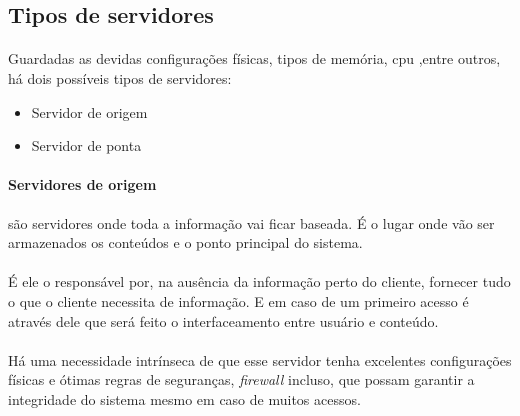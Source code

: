 \subsection{Tipos de servidores}
\label{section:tipos_de_servidores}
\paragraph{}
Guardadas as devidas configura\c{c}\~oes f\'isicas, tipos de mem\'oria, cpu ,entre outros, h\'a dois poss\'iveis tipos de servidores:
\begin{itemize}
	\item Servidor de origem
	\item Servidor de ponta
\end{itemize}

\paragraph{Servidores de origem}s\~ao servidores onde toda a informa\c{c}\~ao vai ficar baseada. \'E o lugar onde v\~ao ser armazenados os conte\'udos e o ponto principal do sistema.
\paragraph{}
\'E ele o respons\'avel por, na aus\^encia da informa\c{c}\~ao perto do cliente, fornecer tudo o que o cliente necessita de informa\c{c}\~ao. E em caso de um primeiro acesso \'e atrav\'es dele que ser\'a feito o interfaceamento entre usu\'ario e conte\'udo.
\paragraph{}
H\'a uma necessidade intr\'inseca de que esse servidor tenha excelentes configura\c{c}\~oes f\'isicas e \'otimas regras de seguran\c{c}as, \textit{firewall} incluso, que possam garantir a integridade do sistema mesmo em caso de muitos acessos.
